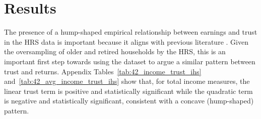 \onlyinsubfile{\setcounter{section}{3}}
\section{Results}
\label{sec:chapter2-results}

\providecommand{\ChapterTableNoteText}[1]{\parbox[t]{0.94\textwidth}{#1}}
\providecommand{\InputStataRegTable}[4]{%
\begin{table}[htbp]
\centering
\caption{#1}%
\label{#2}%
\begin{threeparttable}
\small
\resizebox{\textwidth}{!}{%
%
}%
\begin{tablenotes}[flushleft]
\footnotesize
\item \ChapterTableNoteText{#4}%
\end{tablenotes}
\end{threeparttable}
\end{table}%
}
\providecommand{\InputStataRegTableCompact}[4]{%
\begin{table}[htbp]
\centering
\caption{#1}%
\label{#2}%
\begin{threeparttable}
\begingroup
\footnotesize
\setlength{\tabcolsep}{4pt}%
\renewcommand{\arraystretch}{0.94}%
\resizebox{\textwidth}{!}{%
%
}%
\endgroup
\begin{tablenotes}[flushleft]
\footnotesize
\item \ChapterTableNoteText{#4}%
\end{tablenotes}
\end{threeparttable}
\end{table}%
}


\par The presence of a hump-shaped empirical relationship between earnings and trust in the HRS data is important because it aligns with previous literature \cite{jbpglg2016}. Given the oversampling of older and retired households by the HRS, this is an important first step towards using the dataset to argue a similar pattern between trust and returns. Appendix Tables~\ref{tab:42_income_trust_ihs} and~\ref{tab:42_avg_income_trust_ihs} show that, for total income measures, the linear trust term is positive and statistically significant while the quadratic term is negative and statistically significant, consistent with a concave (hump-shaped) pattern.

